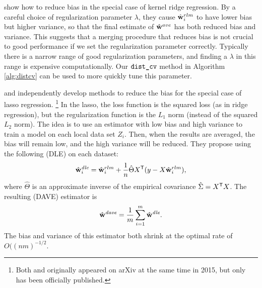 \documentclass[thesis.tex]{subfiles}
\newcommand{\distcv}{\mkprocedure{dist\_cv}}
\newcommand{\wdave}{\hat\w^\textit{dave}}
\newcommand{\wdle}{\hat\w^\textit{dle}}
\begin{document}
\citet{zhang2013divide} show how to reduce bias in the special case of kernel ridge regression.
By a careful choice of regularization parameter $\lambda$,
they cause $\hat{\mathbf w}^{rlm}_i$ to have lower bias but higher variance,
so that the final estimate of $\hat{\mathbf w}^{ave}$ has both reduced bias and variance.
This suggests that a merging procedure that reduces bias is not crucial to good performance if we set the regularization parameter correctly.
Typically there is a narrow range of good regularization parameters,
and finding a $\lambda$ in this range is expensive computationally.
Our $\distcv$ method in Algorithm \ref{alg:distcv} can be used to more quickly tune this parameter.

\citet{battey2015distributed} and \citet{lee2015communication} independently develop methods to reduce the bias for the special case of lasso regression.%
\footnote{
    Both \citet{battey2015distributed} and \citet{lee2015communication} originally appeared on arXiv at the same time in 2015, but only \citet{lee2015communication} has been officially published.
}
In the lasso, the loss function is the squared loss (as in ridge regression),
but the regularization function is the $L_1$ norm (instead of the squared $L_2$ norm).
The idea is to use an estimator with low bias and high variance to train a model on each local data set $Z_i$.
Then, when the results are averaged,
the bias will remain low,
and the high variance will be reduced.
They propose using the following  (DLE) on each dataset:
\begin{equation}
    \wdle_i = \wrlm_i + \frac 1 n \hat\Theta \trans X (y - X\wrlm_i)
    ,
\end{equation}
where $\hat\Theta$ is an approximate inverse of the empirical covariance $\hat\Sigma={X}^{\mathsf{T}} X$.
The resulting  (DAVE) estimator is
\begin{equation}
    \wdave = \frac 1 m \sum_{i=1}^m \wdle
    .
\end{equation}
The bias and variance of this estimator both shrink at the optimal rate of $O((nm)^{-1/2}$.
\end{document}
